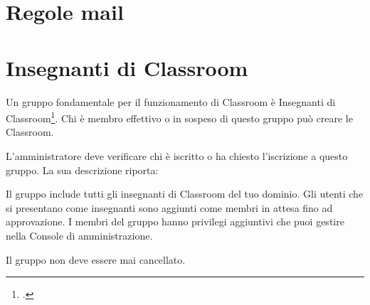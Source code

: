 \section{Regole mail}
\section{Insegnanti di Classroom}
Un gruppo fondamentale per il funzionamento di Classroom è Insegnanti di Classroom\footcite{Google2023}. Chi è membro effettivo o in sospeso di questo  gruppo può creare le Classroom. 

L'amministratore deve verificare chi è iscritto o ha chiesto l'iscrizione a questo gruppo. La sua descrizione riporta:

	Il gruppo include tutti gli insegnanti di Classroom del tuo dominio. Gli utenti che si presentano come insegnanti sono aggiunti come membri in attesa fino ad approvazione. I membri del gruppo hanno privilegi aggiuntivi che puoi gestire nella Console di amministrazione.

Il gruppo non deve essere mai cancellato.
